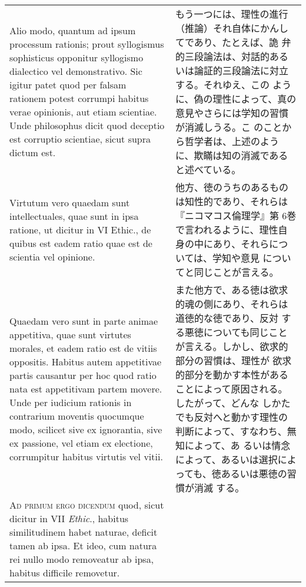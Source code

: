\documentclass[10pt]{jsarticle} %
\begin{document}
\begin{longtable}{p{21em}p{21em}}
\\


Alio modo, quantum ad ipsum processum rationis; prout syllogismus
sophisticus opponitur syllogismo dialectico vel demonstrativo. Sic
igitur patet quod per falsam rationem potest corrumpi habitus verae
opinionis, aut etiam scientiae. Unde philosophus dicit quod deceptio
est corruptio scientiae, sicut supra dictum est.


&

もう一つには、理性の進行（推論）それ自体にかんしてであり、たとえば、詭
弁的三段論法は、対話的あるいは論証的三段論法に対立する。それゆえ、この
ように、偽の理性によって、真の意見やさらには学知の習慣が消滅しうる。こ
のことから哲学者は、上述のように、欺瞞は知の消滅であると述べている。

\\


Virtutum vero quaedam sunt intellectuales, quae sunt in ipsa ratione,
ut dicitur in VI Ethic., de quibus est eadem ratio quae est de
scientia vel opinione.


&

他方、徳のうちのあるものは知性的であり、それらは『ニコマコス倫理学』第
6巻で言われるように、理性自身の中にあり、それらについては、学知や意見
についてと同じことが言える。


\\


Quaedam vero sunt in parte animae appetitiva, quae sunt virtutes
morales, et eadem ratio est de vitiis oppositis. Habitus autem
appetitivae partis causantur per hoc quod ratio nata est appetitivam
partem movere. Unde per iudicium rationis in contrarium moventis
quocumque modo, scilicet sive ex ignorantia, sive ex passione, vel
etiam ex electione, corrumpitur habitus virtutis vel vitii.


&

また他方で、ある徳は欲求的魂の側にあり、それらは道徳的な徳であり、反対
する悪徳についても同じことが言える。しかし、欲求的部分の習慣は、理性が
欲求的部分を動かす本性があることによって原因される。したがって、どんな
しかたでも反対へと動かす理性の判断によって、すなわち、無知によって、あ
るいは情念によって、あるいは選択によっても、徳あるいは悪徳の習慣が消滅
する。


\\



{\scshape Ad primum ergo dicendum} quod, sicut dicitur in VII
{\itshape Ethic}., habitus similitudinem habet naturae, deficit tamen
ab ipsa. Et ideo, cum natura rei nullo modo removeatur ab ipsa,
habitus difficile removetur.



\end{longtable}
\end{document}
